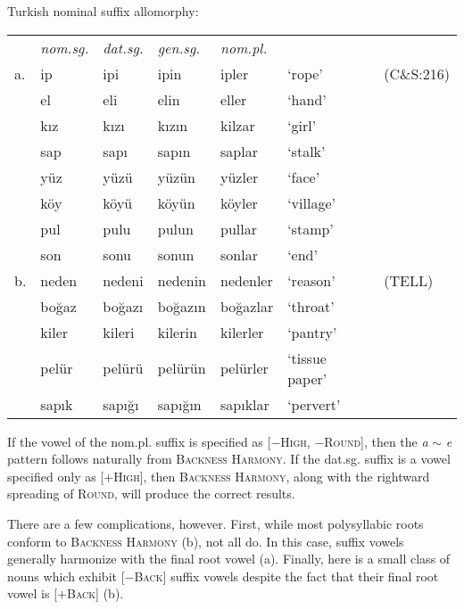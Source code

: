 \ex Turkish nominal suffix allomorphy: \vspace{6pt} \\
\begin{tabular}{l l l l l l l}
   & \emph{nom.sg.} & \emph{dat.sg.} & \emph{gen.sg.} & \emph{nom.pl.} \\
a. & ip             & ipi            & ipin           & ipler          & `rope' & (C\&S:216) \\
   & el             & eli            & elin           & eller          & `hand'    \\
   & kız            & kızı           & kızın          & kilzar         & `girl'    \\
   & sap            & sapı           & sapın          & saplar         & `stalk'   \\
   & yüz            & yüzü           & yüzün          & yüzler         & `face'    \\
   & köy            & köyü           & köyün          & köyler         & `village' \\
   & pul            & pulu           & pulun          & pullar         & `stamp'   \\
   & son            & sonu           & sonun          & sonlar         & `end'     \\
b. & neden          & nedeni         & nedenin        & nedenler       & `reason'  & (TELL) \\
   & boğaz          & boğazı         & boğazın        & boğazlar       & `throat'  \\
   & kiler          & kileri         & kilerin        & kilerler       & `pantry'  \\
   & pelür          & pelürü         & pelürün        & pelürler       & `tissue paper' \\
   & sapık          & sapığı         & sapığın        & sapıklar       & `pervert' \\
\end{tabular} \xe

\noindent
If the vowel of the nom.pl. suffix is specified as [$-$\textsc{High}, $-$\textsc{Round}], then the \emph{a} $\sim$ \emph{e} pattern follows naturally from \textsc{Backness Harmony}. If the dat.sg. suffix is a vowel specified only as [$+$\textsc{High}], then \textsc{Backness Harmony}, along with the rightward spreading of \textsc{Round}, will produce the correct results.

There are a few complications, however. First, while most polysyllabic roots conform to \textsc{Backness Harmony} (\lastx b), not all do. In this case, suffix vowels generally harmonize with the final root vowel (\nextx a). Finally, here is a small class of nouns which exhibit [$-$\textsc{Back}] suffix vowels despite the fact that their final root vowel is [$+$\textsc{Back}] (\nextx b).

